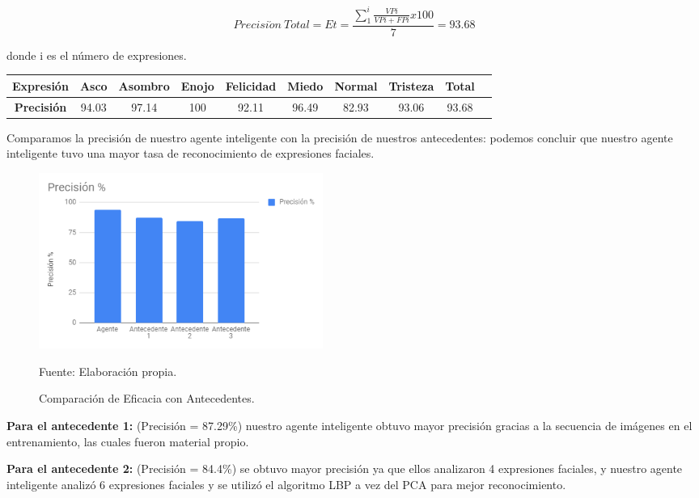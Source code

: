 \begin{equation}
Precisi\acute{o}n~Total=Et=\frac{\sum_{1}^{i}\frac{VPi}{VPi+FPi}x100}{7}=93.68
\end{equation}

donde i es el número de expresiones. 

\begin{table}[ht!]
\centering
\begin{tabular}{|c|c|c|c|c|c|c|c|c|c|} \hline
\bf Expresión & \bf Asco & \bf Asombro & \bf Enojo & \bf Felicidad & \bf Miedo & \bf Normal & \bf Tristeza & \bf Total \\ \hline
\bf Precisión & 94.03 & 97.14 & 100 & 92.11 & 96.49 & 82.93 & 93.06 & 93.68 \\ \hline

\end{tabular}
\end{table}

Comparamos la precisión de nuestro agente inteligente con la precisión de nuestros antecedentes: podemos concluir que nuestro agente inteligente tuvo una mayor tasa de reconocimiento de expresiones faciales. 

\begin{figure}[ht]
\begin{center}
\includegraphics[width=0.45\textwidth]{Imagen32}
\end{center}
\begin{center}
\vskip -0.5cm
\caption{\small{Comparación de Eficacia con Antecedentes.}}
{\small{Fuente: Elaboración propia.}}
\end{center}
\end{figure}

\vskip 3cm

{\bf Para el antecedente 1:} (Precisión = 87.29\%) nuestro agente inteligente obtuvo mayor precisión gracias a la secuencia de imágenes en el entrenamiento, las cuales fueron material propio. 
\vskip 0.1cm

{\bf Para el antecedente 2:} (Precisión = 84.4\%) se obtuvo mayor precisión ya que ellos analizaron 4 expresiones faciales, y nuestro agente inteligente analizó 6 expresiones faciales y se utilizó el algoritmo LBP a vez del PCA para mejor reconocimiento.
\vskip 0.1cm

